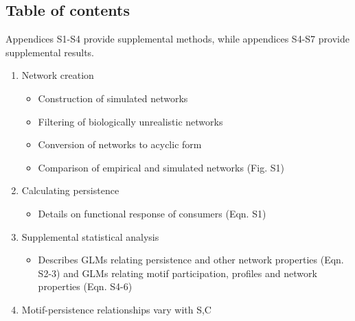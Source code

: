 \documentclass[12pt]{article}
\begin{document}
\setlength{\parindent}{15pt} 
\begin{spacing}{2.0}

\clearpage

\section*{Table of contents}
    {\footnotesize
    \begin{spacing}{1.0}

    Appendices S1-S4 provide supplemental methods, while appendices S4-S7 provide supplemental results.

    \begin{enumerate}
    
        \item Network creation \\
        
            \begin{itemize}
            \item Construction of simulated networks
            \item Filtering of biologically unrealistic networks 
            \item Conversion of networks to acyclic form
            \item Comparison of empirical and simulated networks (Fig. S1)
            \end{itemize}
            
            
        \item Calculating persistence

            \begin{itemize}
                \item Details on functional response of consumers (Eqn. S1)
            \end{itemize}    
            

        \item Supplemental statistical analysis

            \begin{itemize}
                \item Describes GLMs relating persistence and other network properties (Eqn. S2-3) and GLMs relating motif participation, profiles and network properties (Eqn. S4-6)
            \end{itemize}
                
        \item Motif-persistence relationships vary with S,C


\end{enumerate}
\end{spacing}}
\end{spacing}
\end{document}

